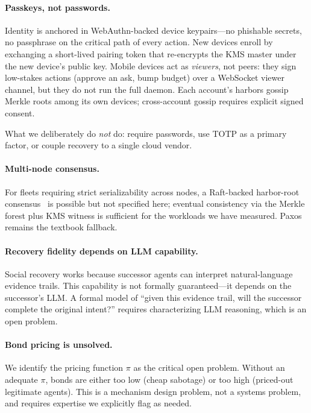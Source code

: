 \documentclass[11pt,a4paper]{article}
\theoremstyle{definition}
\theoremstyle{remark}
\begin{document}
\paragraph{Passkeys, not passwords.} Identity is anchored in WebAuthn-backed device keypairs---no phishable secrets, no passphrase on the critical path of every action. New devices enroll by exchanging a short-lived pairing token that re-encrypts the KMS master under the new device's public key. Mobile devices act as \emph{viewers}, not peers: they sign low-stakes actions (approve an ask, bump budget) over a WebSocket viewer channel, but they do not run the full daemon. Each account's harbors gossip Merkle roots among its own devices; cross-account gossip requires explicit signed consent.

What we deliberately do \emph{not} do: require passwords, use TOTP as a primary factor, or couple recovery to a single cloud vendor.

\pdexercisepointer{\ref{ex:bonded-magic-link-proverif}}{\ref{ex:bonded-cuckoo-pollution}}{\pageref{ex:bonded-magic-link-proverif}}

\paragraph{Multi-node consensus.} For fleets requiring strict serializability across nodes, a Raft-backed harbor-root consensus~ is possible but not specified here; eventual consistency via the Merkle forest plus KMS witness is sufficient for the workloads we have measured. Paxos~ remains the textbook fallback.

\paragraph{Recovery fidelity depends on LLM capability.} Social recovery works because successor agents can interpret natural-language evidence trails. This capability is not formally guaranteed---it depends on the successor's LLM. A formal model of ``given this evidence trail, will the successor complete the original intent?'' requires characterizing LLM reasoning, which is an open problem.

\paragraph{Bond pricing is unsolved.} We identify the pricing function $\pi$ as the critical open problem. Without an adequate $\pi$, bonds are either too low (cheap sabotage) or too high (priced-out legitimate agents). This is a mechanism design problem, not a systems problem, and requires expertise we explicitly flag as needed.
\end{document}
